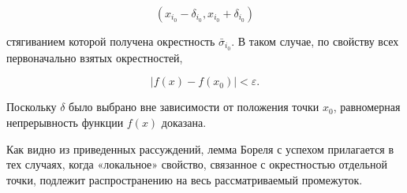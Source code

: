 \documentclass[10pt, twoside]{article}
\begin{document}
\begin{enumerate}
$$
  \left(x_{i_{0}}-\delta_{i_{0}}, x_{i_{0}}+\delta_{i_{0}}\right)
$$

стягиванием которой получена окрестность $\bar{\sigma}_{i_{0}}$. В таком случае, по свойству всех первоначально взятых окрестностей,

$$
  \left|f(x)-f\left(x_{0}\right)\right|<\varepsilon.
$$

Поскольку $\delta$ было выбрано вне зависимости от положения точки $x_{0}$, равномерная непрерывность функции $f(x)$ доказана.

Как видно из приведенных рассуждений, лемма Бореля с успехом прилагается в тех случаях, когда «локальное» свойство, связанное с окрестностью отдельной точки, подлежит распространению на весь рассматриваемый промежуток.

\end{enumerate}
\end{document}
